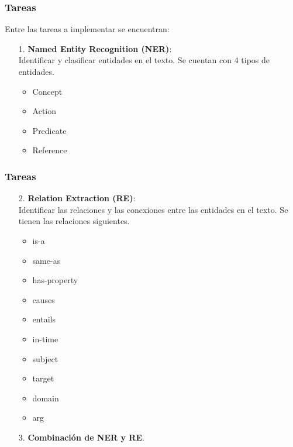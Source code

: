 \documentclass[
11pt, %
%
aspectratio=169, %
]{beamer}
\begin{document}
     \begin{frame}
     	\frametitle{Tareas}
     	Entre las tareas a implementar se encuentran:
     	\begin{enumerate}
     		\item[1.] \textbf{ Named Entity Recognition (NER)}: \\
     		
     		Identificar y clasificar entidades en el texto. Se cuentan con 4 tipos de entidades.
     		\begin{itemize}
     			\item Concept
     			\item Action
     			\item Predicate
     			\item Reference
     		\end{itemize}
     		
     	\end{enumerate}
     	
     	
     \end{frame}
 
 	  \begin{frame}
 		\frametitle{Tareas}
 		
 		\begin{enumerate}			
  			\item[2.] \textbf{Relation Extraction (RE)}:\\
  			
  			 Identificar las relaciones y las conexiones entre las entidades en el texto. Se tienen las relaciones siguientes.
  			 \begin{itemize}
  			 	\item is-a
  			 	\item same-as
  			 	\item has-property
  			 	\item causes
  			 	\item entails
  			 	\item in-time
  			 	\item subject
  			 	\item target
  			 	\item domain
  			 	\item arg
  			 	
  			 \end{itemize}
  			 
 			\item[3.] \textbf{Combinación de NER y RE}.
 		\end{enumerate}
 		
 		
 	\end{frame}
	
\end{document}
